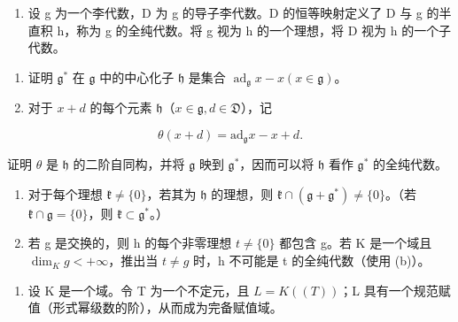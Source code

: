 \begin{enumerate}
\def\labelenumi{\arabic{enumi}.}
\setcounter{enumi}{15}
\tightlist
\item
  设 g 为一个李代数，D 为 g 的导子李代数。D 的恒等映射定义了 D 与 g 的半直积 h，称为 g 的全纯代数。将 g 视为 h 的一个理想，将 D 视为 h 的一个子代数。
\end{enumerate}

\begin{enumerate}
\def\labelenumi{(\alph{enumi})}
\item
  证明 \(\mathfrak{g}^*\) 在 \(\mathfrak{g}\) 中的中心化子 \(\mathfrak{h}\) 是集合 \(\operatorname{ad}_{\mathfrak{g}}x - x(x\in \mathfrak{g})\)。
\item
  对于 \(x + d\) 的每个元素 \(\mathfrak{h}\)（\(x \in \mathfrak{g}, d \in \mathfrak{D}\)），记
\end{enumerate}

\[
\theta (x + d) = \mathrm{ad} _ {\mathfrak {g}} x - x + d.
\]

证明 \(\theta\) 是 \(\mathfrak{h}\) 的二阶自同构，并将 \(\mathfrak{g}\) 映到 \(\mathfrak{g}^*\)，因而可以将 \(\mathfrak{h}\) 看作 \(\mathfrak{g}^*\) 的全纯代数。

\begin{enumerate}
\def\labelenumi{(\alph{enumi})}
\setcounter{enumi}{2}
\item
  对于每个理想 \(\mathfrak{k} \neq \{0\}\)，若其为 \(\mathfrak{h}\) 的理想，则 \(\mathfrak{k} \cap (\mathfrak{g} + \mathfrak{g}^*) \neq \{0\}\)。（若 \(\mathfrak{k} \cap \mathfrak{g} = \{0\}\)，则 \(\mathfrak{k} \subset \mathfrak{g}^*\)。）
\item
  若 g 是交换的，则 h 的每个非零理想 \(t \neq \{0\}\) 都包含 g。若 K 是一个域且 \(\dim_{K} g < +\infty\)，推出当 \(t \neq g\) 时，h 不可能是 t 的全纯代数（使用 (b)）。
\end{enumerate}

\begin{enumerate}
\def\labelenumi{\arabic{enumi}.}
\setcounter{enumi}{16}
\tightlist
\item
  设 K 是一个域。令 T 为一个不定元，且 \(L = K((T))\)；L 具有一个规范赋值（形式幂级数的阶），从而成为完备赋值域。
\end{enumerate}

